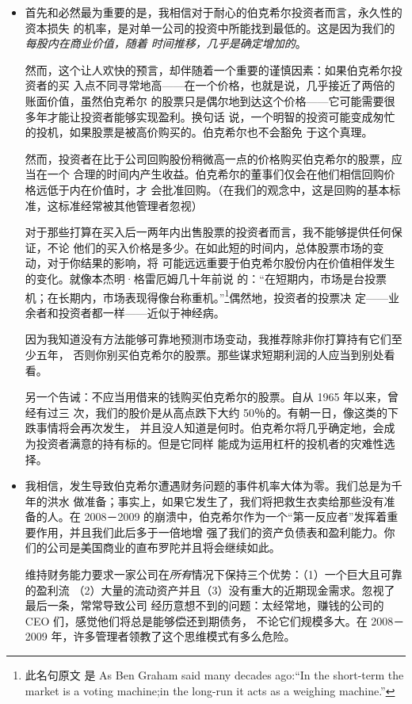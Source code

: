 \documentclass[UTF8,a4paper,zihao=-4,fontset = windows]{ctexart} %
\begin{document}
\begin{itemize}
    \item \noindent 首先和必然最为重要的是，我相信对于耐心的伯克希尔投资者而言，永久性的资本损失
的机率，是对单一公司的投资中所能找到最低的。这是因为我们的\textit{每股内在商业价值，随着
时间推移，几乎是确定增加的}。

然而，这个让人欢快的预言，却伴随着一个重要的谨慎因素：如果伯克希尔投资者的买
入点不同寻常地高——在一个价格，也就是说，几乎接近了两倍的账面价值，虽然伯克希尔
的股票只是偶尔地到达这个价格——它可能需要很多年才能让投资者能够实现盈利。换句话
说，一个明智的投资可能变成匆忙的投机，如果股票是被高价购买的。伯克希尔也不会豁免
于这个真理。

然而，投资者在比于公司回购股份稍微高一点的价格购买伯克希尔的股票，应当在一个
合理的时间内产生收益。伯克希尔的董事们仅会在他们相信回购价格远低于内在价值时，才
会批准回购。（在我们的观念中，这是回购的基本标准，这标准经常被其他管理者忽视）

对于那些打算在买入后一两年内出售股票的投资者而言，我不能够提供任何保证，不论
他们的买入价格是多少。在如此短的时间内，总体股票市场的变动，对于你结果的影响，将
可能远远重要于伯克希尔股份内在价值相伴发生的变化。就像本杰明·格雷厄姆几十年前说
的：“在短期内，市场是台投票机；在长期内，市场表现得像台称重机。”\footnote{此名句原文
是 As Ben Graham said many decades ago:“In the short-term the market is a voting
machine;in the long-run it acts as a weighing machine.”}偶然地，投资者的投票决
定——业余者和投资者都一样——近似于神经病。

因为我知道没有方法能够可靠地预测市场变动，我推荐除非你打算持有它们至少五年，
否则你别买伯克希尔的股票。那些谋求短期利润的人应当到别处看看。

另一个告诫：不应当用借来的钱购买伯克希尔的股票。自从 1965 年以来，曾经有过三
次，我们的股价是从高点跌下大约 50％的。有朝一日，像这类的下跌事情将会再次发生，
并且没人知道是何时。伯克希尔将几乎确定地，会成为投资者满意的持有标的。但是它同样
能成为运用杠杆的投机者的灾难性选择。

    \item \noindent 我相信，发生导致伯克希尔遭遇财务问题的事件机率大体为零。我们总是为千年的洪水
做准备；事实上，如果它发生了，我们将把救生衣卖给那些没有准备的人。在 2008－2009
的崩溃中，伯克希尔作为一个“第一反应者”发挥着重要作用，并且我们此后多于一倍地增
强了我们的资产负债表和盈利能力。你们的公司是美国商业的直布罗陀并且将会继续如此。

维持财务能力要求一家公司在\textit{所有}情况下保持三个优势：（1）一个巨大且可靠的盈利流
（2）大量的流动资产并且（3）没有重大的近期现金需求。忽视了最后一条，常常导致公司
经历意想不到的问题：太经常地，赚钱的公司的 CEO 们，感觉他们将总是能够偿还到期债务，
不论它们规模多大。在 2008－2009 年，许多管理者领教了这个思维模式有多么危险。


\end{itemize}
\end{document}

